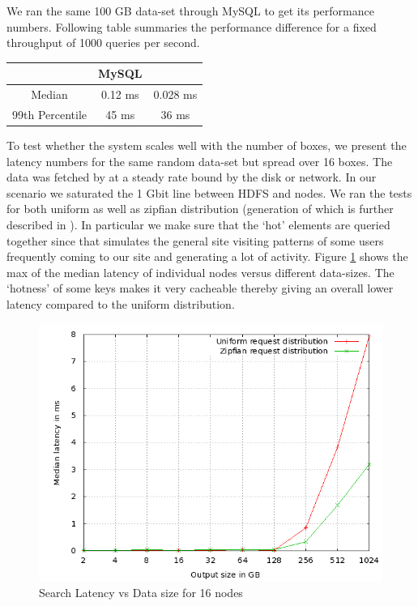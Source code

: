 \documentclass[10pt,twocolumn,preprint,nonatbib,numbers]{sigplanconf}
\begin{document}
We ran the same 100 GB data-set through MySQL to get its performance numbers. Following table summaries the performance difference for a fixed throughput of 1000 queries per second. 

\begin{center}
    \begin{tabular}{ | c | c | c |  }
    \hline
     & MySQL & \projectname{} \\ \hline
    Median &   0.12 ms &  0.028	ms \\
	99th Percentile	& 45 ms & 36 ms \\
\hline
    \end{tabular}
\end{center}

To test whether the system scales well with the number of boxes, we present the latency numbers for the same random data-set but spread over 16 boxes. The data was fetched by \projectname{} at a steady rate bound by the disk or network. In our scenario we saturated the 1 Gbit line between HDFS and \projectname{} nodes. We ran the tests for both uniform as well as zipfian distribution (generation of which is further described in \cite{gray}). In particular we make sure that the `hot' elements are queried together since that simulates the general site visiting patterns of some users frequently coming to our site and generating a lot of activity. Figure \ref{16search} shows the max of the median latency of individual nodes versus different data-sizes. The `hotness' of some keys makes it very cacheable thereby giving an overall lower latency compared to the uniform distribution. 

\begin{figure}
  \centering
    \includegraphics[scale=0.35]{images/search_16node.png}
  \caption{Search Latency vs Data size for 16 nodes}
  \label{16search}
\end{figure}
\end{document}
